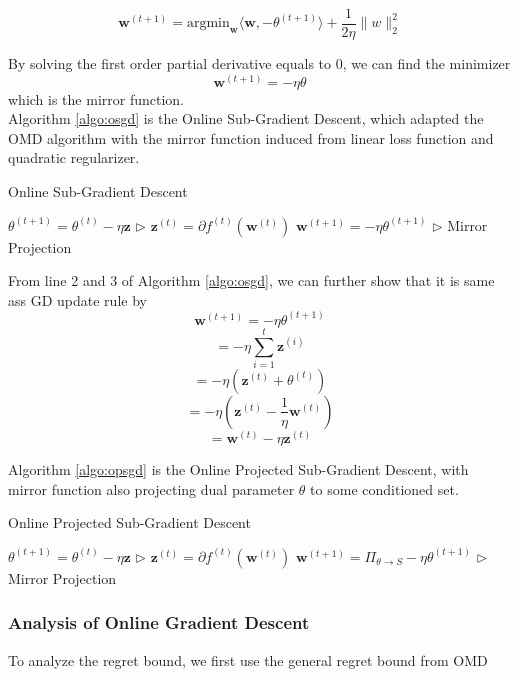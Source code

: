 \documentclass[11pt]{article}
\begin{document}
$$\textbf{w}^{(t+1)} =  \text{argmin}_{\textbf{w}} \langle \textbf{w}, - \theta^{(t+1)}\rangle + \frac{1}{2\eta} \| w \|_2^2$$

By solving the first order partial derivative equals to 0, we can find the minimizer
$$\textbf{w}^{(t+1)} = -\eta \theta$$
which is the mirror function. \\
Algorithm \ref{algo:osgd} is the Online Sub-Gradient Descent, which adapted the OMD algorithm with the mirror function induced from linear loss function and quadratic regularizer.
\begin{algorithm}[H]
\caption{Online Sub-Gradient Descent}
\label{algo:osgd}
\begin{algorithmic}[1]
\STATE $\theta^{(t+1)} = \theta^{(t)} - \eta \textbf{z}$ \hfill $\triangleright$ $ \textbf{z}^{(t)} = \partial f^{(t)}(\textbf{w}^{(t)})$
\STATE $\textbf{w}^{(t+1)} = -\eta \theta^{(t+1)}$ \hfill $\triangleright$ Mirror Projection
\ENDFOR
\end{algorithmic}
\end{algorithm}
From line 2 and 3 of Algorithm \ref{algo:osgd}, we can further show that it is same ass GD update rule by 
$$\textbf{w}^{(t+1)} = -\eta \theta^{(t+1)}$$
$$= -\eta \sum_{i=1}^t \textbf{z}^{(i)}$$
$$= -\eta (\textbf{z}^{(t)} + \theta ^{(t)})$$
$$= -\eta (\textbf{z}^{(t)} - \frac{1}{\eta}\textbf{w} ^{(t)})$$
$$= \textbf{w}^{(t)} - \eta \textbf{z}^{(t)}$$

Algorithm \ref{algo:opsgd} is the Online Projected Sub-Gradient Descent, with mirror function also projecting dual parameter $\theta$ to some conditioned set. 
\begin{algorithm}[H]
\caption{Online Projected Sub-Gradient Descent}
\label{algo:opsgd}
\begin{algorithmic}[1]
\STATE $\theta^{(t+1)} = \theta^{(t)} - \eta \textbf{z}$ \hfill $\triangleright$ $ \textbf{z}^{(t)} = \partial f^{(t)}(\textbf{w}^{(t)})$
\STATE $\textbf{w}^{(t+1)} = \Pi_{\theta \rightarrow S}-\eta \theta^{(t+1)}$ \hfill $\triangleright$ Mirror Projection
\ENDFOR
\end{algorithmic}
\end{algorithm}

\subsubsection{Analysis of Online Gradient Descent}
To analyze the regret bound, we first use the general regret bound from OMD
\end{document}
